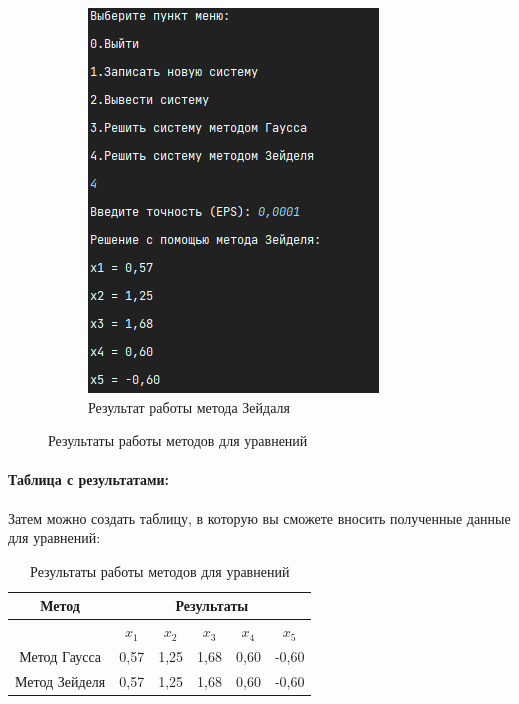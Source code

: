 \documentclass[12pt]{article}
\begin{document}
\begin{figure}[ht]
\begin{subfigure}{0.4\textwidth}
            \includegraphics[width=\linewidth]{image/zeidel_equation}
            \caption{Результат работы метода Зейдаля}
        \end{subfigure}
        \caption{Результаты работы методов для уравнений}
    \end{figure}

    \paragraph{Таблица с результатами:}

    Затем можно создать таблицу, в которую вы сможете вносить полученные данные для уравнений:

    \begin{table}[ht]
        \centering
        \begin{tabular}{|c|c|c|c|c|c|}
            \hline
            \textbf{Метод} & \multicolumn{5}{c|}{\textbf{Результаты}} \\
            \hline
            & $x_1$ & $x_2$ & $x_3$ & $x_4$ & $x_5$ \\
            \hline
            Метод Гаусса  & 0,57  & 1,25  & 1,68  & 0,60  & -0,60 \\
            \hline
            Метод Зейделя & 0,57  & 1,25  & 1,68  & 0,60  & -0,60 \\
            \hline
        \end{tabular}
        \caption{Результаты работы методов для уравнений}
    \end{table}
\end{document}
